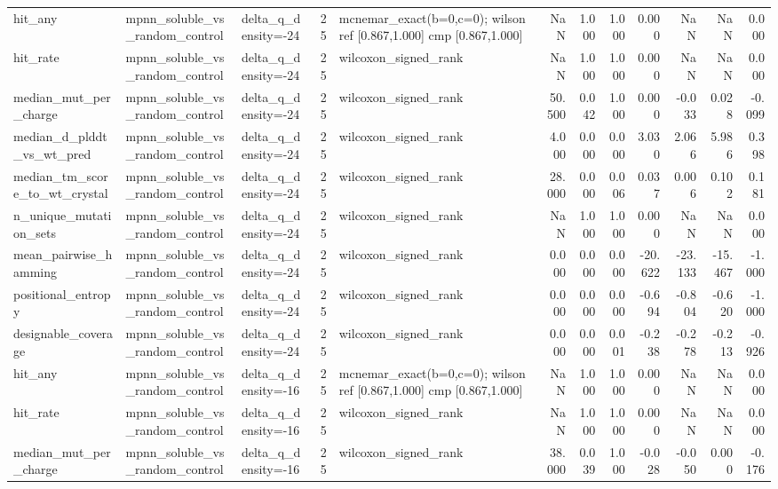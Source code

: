 \begin{table}
{\begin{tabular}{lllrlrrrrrrr}
hit\_any & mpnn\_soluble\_vs\_random\_control & delta\_q\_density=-24 & 25 & mcnemar\_exact(b=0,c=0); wilson ref [0.867,1.000] cmp [0.867,1.000] & NaN & 1.000 & 1.000 & 0.000 & NaN & NaN & 0.000 \\
hit\_rate & mpnn\_soluble\_vs\_random\_control & delta\_q\_density=-24 & 25 & wilcoxon\_signed\_rank & NaN & 1.000 & 1.000 & 0.000 & NaN & NaN & 0.000 \\
median\_mut\_per\_charge & mpnn\_soluble\_vs\_random\_control & delta\_q\_density=-24 & 25 & wilcoxon\_signed\_rank & 50.500 & 0.042 & 1.000 & 0.000 & -0.033 & 0.028 & -0.099 \\
median\_d\_plddt\_vs\_wt\_pred & mpnn\_soluble\_vs\_random\_control & delta\_q\_density=-24 & 25 & wilcoxon\_signed\_rank & 4.000 & 0.000 & 0.000 & 3.030 & 2.066 & 5.986 & 0.398 \\
median\_tm\_score\_to\_wt\_crystal & mpnn\_soluble\_vs\_random\_control & delta\_q\_density=-24 & 25 & wilcoxon\_signed\_rank & 28.000 & 0.000 & 0.006 & 0.037 & 0.006 & 0.102 & 0.181 \\
n\_unique\_mutation\_sets & mpnn\_soluble\_vs\_random\_control & delta\_q\_density=-24 & 25 & wilcoxon\_signed\_rank & NaN & 1.000 & 1.000 & 0.000 & NaN & NaN & 0.000 \\
mean\_pairwise\_hamming & mpnn\_soluble\_vs\_random\_control & delta\_q\_density=-24 & 25 & wilcoxon\_signed\_rank & 0.000 & 0.000 & 0.000 & -20.622 & -23.133 & -15.467 & -1.000 \\
positional\_entropy & mpnn\_soluble\_vs\_random\_control & delta\_q\_density=-24 & 25 & wilcoxon\_signed\_rank & 0.000 & 0.000 & 0.000 & -0.694 & -0.804 & -0.620 & -1.000 \\
designable\_coverage & mpnn\_soluble\_vs\_random\_control & delta\_q\_density=-24 & 25 & wilcoxon\_signed\_rank & 0.000 & 0.000 & 0.001 & -0.238 & -0.278 & -0.213 & -0.926 \\
hit\_any & mpnn\_soluble\_vs\_random\_control & delta\_q\_density=-16 & 25 & mcnemar\_exact(b=0,c=0); wilson ref [0.867,1.000] cmp [0.867,1.000] & NaN & 1.000 & 1.000 & 0.000 & NaN & NaN & 0.000 \\
hit\_rate & mpnn\_soluble\_vs\_random\_control & delta\_q\_density=-16 & 25 & wilcoxon\_signed\_rank & NaN & 1.000 & 1.000 & 0.000 & NaN & NaN & 0.000 \\
median\_mut\_per\_charge & mpnn\_soluble\_vs\_random\_control & delta\_q\_density=-16 & 25 & wilcoxon\_signed\_rank & 38.000 & 0.039 & 1.000 & -0.028 & -0.050 & 0.000 & -0.176 \\

\end{tabular}}
\end{table}
